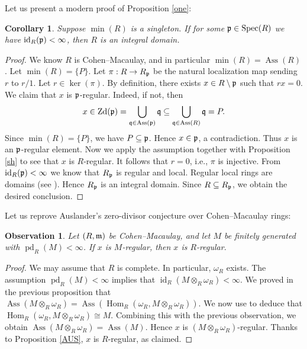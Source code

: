 \documentclass[10. pt,a4paper]{amsart}
\newtheorem{corollary}[theorem]{Corollary}
\newtheorem{observation}[theorem]{Observation}
\theoremstyle{definition}
\theoremstyle{remark}
\newcommand{\Ass}{\operatorname{Ass}}
\newcommand{\Spec}{\operatorname{Spec}}
\newcommand{\id}{\operatorname{id}}
\newcommand{\pd}{\operatorname{pd}}
\newcommand{\Hom}{\operatorname{Hom}}
\newcommand{\Zd}{\operatorname{Zd}}
\newcommand{\fm}{\frak{m}}
\newcommand{\fp}{\frak{p}}
\newcommand{\fq}{\frak{q}}
\begin{document}
Let us present a modern proof of Proposition \ref{one}:

\begin{corollary}\label{csing}
	Suppose $\min(R)$ is a singleton. If for some $\fp \in \Spec(R)$ we have $\id_R(\fp) < \infty$, then $R$ is an integral domain.
\end{corollary}

\begin{proof}
	We know $R$ is Cohen--Macaulay, and in particular $\min(R) = \Ass(R)$. Let $\min(R) = \{P\}$.
	Let $\pi : R \to R_{\fp}$ be the natural localization map sending $r$ to $r/1$. Let $r \in \ker(\pi)$. By definition, there exists $x \in R \setminus \fp$ such that $rx = 0$. We claim that $x$ is $\fp$-regular. Indeed, if not, then
	\[
	x \in \Zd(\fp) = \bigcup_{\fq \in \Ass(\fp)} \fq \subseteq \bigcup_{\fq \in \Ass(R)} \fq = P.
	\]
	Since $\min(R) = \{P\}$, we have $P \subseteq \fp$. Hence $x \in \fp$, a contradiction. Thus $x$ is an $\fp$-regular element.
	Now we apply the assumption together with Proposition \ref{sh} to see that $x$ is $R$-regular. It follows that $r = 0$, i.e., $\pi$ is injective.
	From $\id_R(\fp) < \infty$ we know that $R_{\fp}$ is regular and local. Regular local rings are domains (see \cite[Proposition 2.2.3]{BH}). Hence $R_{\fp}$ is an integral domain. Since $R \subseteq R_{\fp}$, we obtain the desired conclusion.
\end{proof}

Let us reprove Auslander's zero-divisor conjecture over Cohen--Macaulay rings:

\begin{observation}\label{NEW}
	Let $(R,\fm)$ be Cohen--Macaulay, and let $M$ be finitely generated with $\pd_R(M) < \infty$. If $x$ is $M$-regular, then $x$ is $R$-regular.
\end{observation}

\begin{proof}
	We may assume that $R$ is complete. In particular, $\omega_R$ exists.
	The assumption $\pd_R(M) < \infty$ implies that $\id_R(M \otimes_R \omega_R) < \infty$.
	We proved in the previous proposition that $\Ass(M \otimes_R \omega_R) = \Ass(\Hom_R(\omega_R, M \otimes_R \omega_R))$.
	We now use \cite[Theorem 2.9]{sha} to deduce that $\Hom_R(\omega_R, M \otimes_R \omega_R) \cong M$. Combining this with the previous observation, we obtain $\Ass(M \otimes_R \omega_R) = \Ass(M)$. Hence $x$ is $(M \otimes_R \omega_R)$-regular.
	Thanks to Proposition \ref{AUS}, $x$ is $R$-regular, as claimed.
\end{proof}
\end{document}
